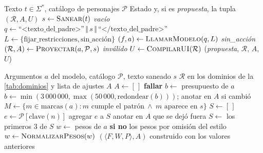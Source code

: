 \documentclass[11pt,letterpaper]{article}
\newcommand{\R}{\mathcal{R}}
\begin{document}
\begin{algorithm}[ht]
\caption{\textsc{Interpretar}$(t,\mathcal{P})$}\label{alg:interpretar}
\begin{algorithmic}[1]
\Require Texto $t\in\Sigma^{*}$, cat\'alogo de personajes $\mathcal{P}$
\Ensure Estado y, si es \emph{propuesta}, la tupla $(\R,A,U)$
\State $s\gets \textsc{Sanear}(t)$ 
 \State \Return \emph{vac\'io} \EndIf
\State $q\gets \text{``<texto\_del\_padre>''}\,\Vert\, s\,\Vert\,\text{``</texto\_del\_padre>''}$
\State $L\gets\{\text{fijar\_restricciones},\text{sin\_acci\'on}\}$ 
\State $(f,a)\gets \textsc{LlamarModelo}(q,L)$ 
 \State \Return \emph{sin\_acci\'on} \EndIf
\State $(\R,A)\gets \textsc{Proyectar}(a,\mathcal{P},s)$ 
 \State \Return \emph{inv\'alido} \EndIf
\State $U\gets \textsc{CompilarUI}(\R)$ 
\State \Return (\emph{propuesta}, $\R$, $A$, $U$) 
\end{algorithmic}
\end{algorithm}

\begin{algorithm}[ht]
\caption{\textsc{Proyectar}$(a,\mathcal{P},s)$}\label{alg:proyectar}
\begin{algorithmic}[1]
\Require Argumentos $a$ del modelo, cat\'alogo $\mathcal{P}$, texto saneado $s$
\Ensure $\R$ en los dominios de la \cref{tab:dominios} y lista de ajustes $A$
\State $A\gets[\,]$
 \State \textbf{fallar} \EndIf
\State $b\gets$ presupuesto de $a$
 \State $b\gets\min(3\,000\,000,\max(50\,000,\text{redondear}(b)))$; anotar en $A$ si cambi\'o \EndIf
\State $M\gets\{m\in\text{marcas}(a): m\text{ cumple el patr\'on}\ \wedge\ m\text{ aparece en }s\}$ 
\State $S\gets[\,]$
  \State $e\gets \mathcal{P}[\text{clave}(n)]$
   \State agregar $e$ a $S$ \Else \State anotar en $A$ que se dej\'o fuera \EndIf
\EndFor
\State $S\gets$ los primeros 3 de $S$
\State $w\gets$ pesos de $a$ \textbf{si no} los pesos por omisi\'on del estilo
\State $w\gets \textsc{NormalizarPesos}(w)$ 
\State \Return $(\langle F,W,P\rangle, A)$ construido con los valores anteriores
\end{algorithmic}
\end{algorithm}
\end{document}
